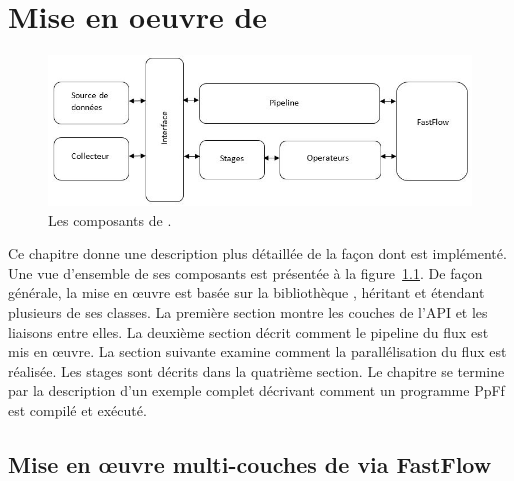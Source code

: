 
\chapter{Mise en oeuvre de \PpFf}
\label{implementation.chap}




\begin{figure}[ht]
\centering
     \includegraphics[width=1.0\textwidth]{Figures/AllComponentsAPI.jpg}
      \caption{Les composants de .}
       \label{AllComponentsAPI.fig}
\end{figure}


Ce chapitre donne une description plus d\'etaill\'ee de la fa\c{c}on dont  est impl\'ement\'e. Une vue d'ensemble de ses composants est pr\'esent\'ee à la figure~\ref{AllComponentsAPI.fig}. De fa\c{c}on g\'en\'erale, la mise en \oe{}uvre est bas\'ee sur la biblioth\`eque , h\'eritant et \'etendant plusieurs de ses classes. La premi\`ere section montre les couches de l'API et les liaisons entre elles.  La deuxi\`eme section d\'ecrit comment le pipeline du flux est mis en œuvre. La section suivante examine comment la parall\'elisation du flux est r\'ealis\'ee. Les stages sont d\'ecrits dans la quatri\`eme section. Le chapitre se termine par la description d'un exemple complet d\'ecrivant comment un programme PpFf est compil\'e et ex\'ecut\'e.


\section{Mise en \oe{}uvre multi-couches de \PpFf{} via FastFlow}



